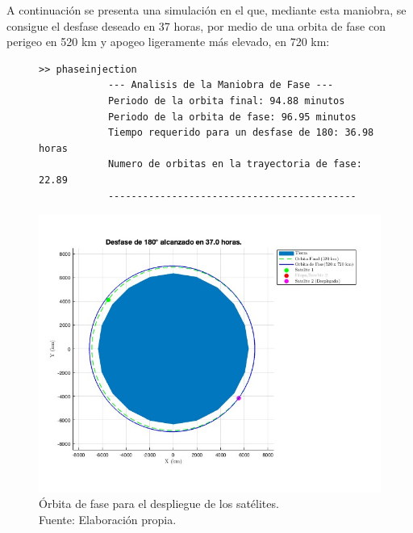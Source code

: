 A continuación se presenta una simulación en el que, mediante esta maniobra, se consigue el desfase deseado en 37 horas, por medio de una orbita de fase con perigeo en 520 km y apogeo ligeramente más elevado, en 720 km:
\begin{figure}[H]
    \centering
    \begin{minipage}[t]{0.48\textwidth}
        \centering
        \begin{lstlisting}[basicstyle=\tiny\ttfamily]
            >> phaseinjection
            --- Analisis de la Maniobra de Fase ---
            Periodo de la orbita final: 94.88 minutos
            Periodo de la orbita de fase: 96.95 minutos
            Tiempo requerido para un desfase de 180: 36.98 horas
            Numero de orbitas en la trayectoria de fase: 22.89
            -------------------------------------------
        \end{lstlisting}
    \end{minipage}
    \hfill
    \begin{minipage}[t]{0.48\textwidth}
        \centering
        \includegraphics[width=\linewidth]{6.Lanzadores/phasing.jpg}
        \caption{Órbita de fase para el despliegue de los satélites.\\Fuente: Elaboración propia.}
        \label{fig:phasing}
    \end{minipage}
\end{figure}
